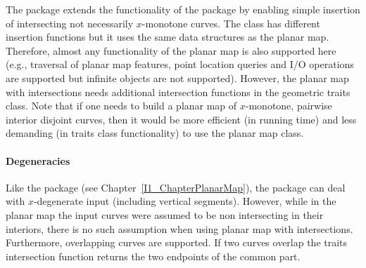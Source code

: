   The  package extends the
  functionality of the  package by enabling simple
  insertion of intersecting not necessarily $x$-monotone curves. The
   class has different insertion
  functions but it uses the same data structures as the planar
  map. Therefore, almost any functionality of the planar map is also
  supported here (e.g., traversal of planar map features, point
  location queries and I/O operations are supported but infinite
  objects are not supported). However, the planar map with
  intersections needs additional intersection functions in the
  geometric traits class. Note that if one needs to build a planar map
  of $x$-monotone, pairwise interior disjoint curves, then it would be
  more efficient (in running time) and less demanding (in traits class
  functionality) to use the planar map class.

\paragraph{Degeneracies} 
  Like the  package (see
  Chapter~\ref{I1_ChapterPlanarMap}), the  package can deal with $x$-degenerate input (including
  vertical segments). However, while in the planar map the input
  curves were assumed to be non intersecting in their interiors, there
  is no such assumption when using planar map with
  intersections. Furthermore, overlapping curves are supported. If two
  curves overlap the traits intersection function returns the two
  endpoints of the common part.



